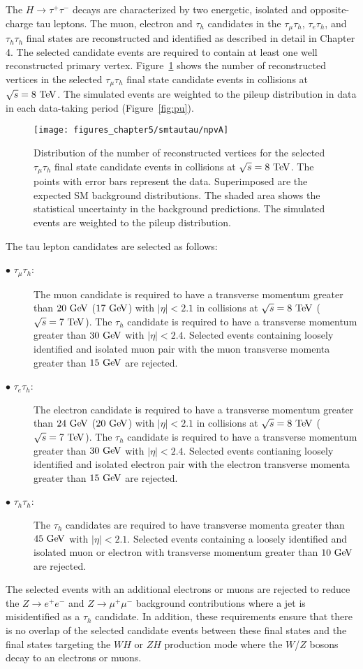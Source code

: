 The $H \rightarrow \tau^{+}\tau^{-}$ decays are characterized by two energetic, isolated and opposite-charge tau leptons. The muon, electron and $\tau_h$ candidates in the  $\tau_{\mu}\tau_{h}$, $\tau_{e}\tau_{h}$, and $\tau_{h}\tau_{h}$  final states are reconstructed and identified as described in detail in Chapter 4.  The selected candidate events are required to contain at least one well reconstructed primary vertex. Figure~\ref{fig:npv} shows the number of reconstructed vertices in the selected $\tau_{\mu}\tau_{h}$ final state candidate events in collisions at $\sqrt{s}=8~\mathrm{Te\kern -0.1em V}$. The simulated events are weighted to the pileup distribution in data in each data-taking period (Figure~\ref{fig:pu}). 
\begin{figure}[htbp]
\centering
\texttt{[image: figures\_chapter5/smtautau/npvA]}
\caption{Distribution of the number of reconstructed vertices for the selected $\tau_{\mu}\tau_{h}$ final state candidate events in collisions at $\sqrt{s}=8~\mathrm{Te\kern -0.1em V}$. The points with error bars represent the data. Superimposed are the expected SM background distributions. The shaded area shows the statistical uncertainty in the background predictions. The simulated events are weighted to the pileup distribution.}
\label{fig:npv}
\end{figure}
The tau lepton candidates are selected as follows:
\begin{description}
\item[$\bullet$ $\tau_{\mu}\tau_h$:] The muon candidate is required to have a transverse momentum greater than  $20~\mathrm{Ge\kern -0.1em V}$ ($17~\mathrm{Ge\kern -0.1em V}$) with $|\eta|<2.1$ in collisions at $\sqrt{s}=8~\mathrm{Te\kern -0.1em V}$ ($\sqrt{s}=7~\mathrm{Te\kern -0.1em V}$). The $\tau_h$ candidate is required to have a transverse momentum greater than $30~\mathrm{Ge\kern -0.1em V}$ with $|\eta|<2.4$. Selected events containing loosely identified and isolated muon pair with the muon transverse momenta greater than $15~\mathrm{Ge\kern -0.1em V}$ are rejected. 
\item[$\bullet$ $\tau_{e}\tau_h$:] The electron candidate is required to have a transverse momentum greater than  $24~\mathrm{Ge\kern -0.1em V}$ ($20~\mathrm{Ge\kern -0.1em V}$) with $|\eta|<2.1$ in collisions at $\sqrt{s}=8~\mathrm{Te\kern -0.1em V}$ ($\sqrt{s}=7~\mathrm{Te\kern -0.1em V}$). The $\tau_h$ candidate is required to have a transverse momentum greater than $30~\mathrm{Ge\kern -0.1em V}$ with $|\eta|<2.4$. Selected events contianing loosely identified and isolated electron pair with the electron transverse momenta greater than $15~\mathrm{Ge\kern -0.1em V}$ are rejected. 
\item[$\bullet$ $\tau_{h}\tau_h$:] The $\tau_h$ candidates are required to have transverse momenta greater than $45~\mathrm{Ge\kern -0.1em V}$ with $|\eta|<2.1$. Selected events containing a loosely identified and isolated muon or electron with transverse momentum greater than $10~\mathrm{Ge\kern -0.1em V}$ are rejected. 
\end{description}    
The selected events with an additional electrons or muons are rejected to reduce the $Z \rightarrow e^+e^-$ and $Z \rightarrow \mu^+\mu^-$ background contributions where a jet is misidentified as a $\tau_h$ candidate. In addition, these requirements ensure that there is no overlap of the selected candidate events between these final states and the final states targeting the $WH$ or $ZH$ production mode where the $W$/$Z$ bosons decay to an electrons or muons.   

